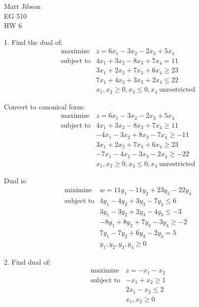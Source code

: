 \documentclass{article}
\begin{document}
\begin{flushright}
Matt Jibson \\
EG 510 \\
HW 6
\end{flushright}

1. Find the dual of: \\
\begin{displaymath}
\begin{array}{ll}
\textrm{maximize} & z = 6x_1 - 3x_2 - 2x_3 + 5x_4 \\
\textrm{subject to} & 4x_1 + 3x_2 - 8x_3 + 7x_4 = 11 \\
& 3x_1 + 2x_2 + 7x_3 + 6x_4 \ge 23 \\
& 7x_1 + 4x_2 + 3x_3 + 2x_4 \le 22 \\
& x_1, x_2 \ge 0, x_3 \le 0, x_4\ \textrm{unrestricted}
\end{array}
\end{displaymath}

Convert to canonical form: \\
\begin{displaymath}
\begin{array}{ll}
\textrm{maximize} & z = 6x_1 - 3x_2 - 2x_3 + 5x_4 \\
\textrm{subject to} & 4x_1 + 3x_2 - 8x_3 + 7x_4 \ge 11 \\
& -4x_1 - 3x_2 + 8x_3 - 7x_4 \ge -11 \\
& 3x_1 + 2x_2 + 7x_3 + 6x_4 \ge 23 \\
& -7x_1 - 4x_2 - 3x_3 - 2x_4 \ge -22 \\
& x_1, x_2 \ge 0, x_3 \le 0, x_4\ \textrm{unrestricted}
\end{array}
\end{displaymath}

Dual is: \\
\begin{displaymath}
\begin{array}{ll}
\textrm{minimize} & w = 11y_1 -11y_2 + 23y_3 - 22y_4 \\
\textrm{subject to} & 4y_1 -4y_2 + 3y_3 - 7y_4 \le 6 \\
& 3y_1 - 3y_2 + 2y_3 - 4y_3 \le -3 \\
& -8y_1 + 8y_2 + 7y_3 - 3y_4 \ge -2 \\
& 7y_1 - 7y_2 + 6y_3 -2y_4 = 5 \\
& y_1, y_2, y_3, y_4 \ge 0
\end{array}
\end{displaymath}

2. Find dual of: \\
\begin{displaymath}
\begin{array}{ll}
\textrm{maximize} & z = -x_1 - x_2 \\
\textrm{subject to} & -x_1 + x_2 \ge 1 \\
& 2x_1 - x_2 \le 2 \\
& x_1, x_2 \ge 0
\end{array}
\end{displaymath}
\end{document}
